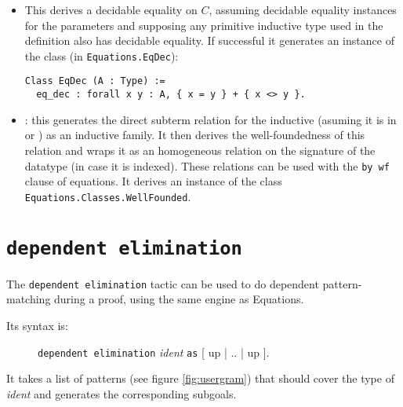 \begin{itemize}
\item {}
  This derives a decidable equality on $C$, assuming decidable equality 
  instances for the parameters and supposing any primitive inductive
  type used in the definition also has decidable equality. If
  successful it generates an instance of the class (in \texttt{Equations.EqDec}):
\begin{verbatim}
Class EqDec (A : Type) :=
  eq_dec : forall x y : A, { x = y } + { x <> y }.
\end{verbatim}
  
\item {}: this generates the direct subterm relation for the
  inductive (asuming it is in  or ) as an inductive family.
  It then derives the well-foundedness of this relation and wraps it
  as an homogeneous relation on the signature of the datatype (in case
  it is indexed). These relations can be used with the \texttt{by wf}
  clause of equations. It derives an instance of the class
  \texttt{Equations.Classes.WellFounded}.

\end{itemize}

\section{\texttt{dependent elimination}}

The \texttt{dependent elimination} tactic can be used to do dependent
pattern-matching during a proof, using the same engine as Equations.

Its syntax is:
\begin{figure}[h]
  \texttt{dependent elimination} \textit{ident} \texttt{as} [ up | .. | up ].
\end{figure}

It takes a list of patterns (see figure \ref{fig:usergram}) that should cover the type of \textit{ident}
and generates the corresponding subgoals.


